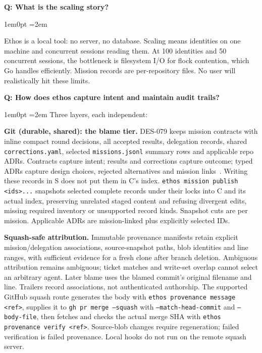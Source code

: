 \documentclass[11pt,letterpaper]{article}
\newcounter{faqnum}
\newenvironment{faqpair}[1]{%
  \needspace{4\baselineskip}%
  \vspace{0.5em}%
  \refstepcounter{faqnum}%
  \noindent\textbf{\color{SectionBlue}Q\thefaqnum: #1}\par\nopagebreak[4]%
  \vspace{0.2em}%
  \begin{adjustwidth}{1em}{0pt}%
  \setlength{\parindent}{0pt}%
  \emergencystretch=2em%
}{%
  \end{adjustwidth}%
  \vspace{0.5em}%
}
\begin{document}
\begin{faqpair}{What is the scaling story?}
Ethos is a local tool: no server, no database. Scaling means identities on one machine and concurrent sessions reading them. At 100 identities and 50 concurrent sessions, the bottleneck is filesystem I/O for flock contention, which Go handles efficiently. Mission records are per-repository files. No user will realistically hit these limits.
\end{faqpair}

\begin{faqpair}{How does ethos capture intent and maintain audit trails?}\label{faq:audit-trails}
Three layers, each independent:

\textbf{Git (durable, shared): the blame tier.} DES-079 keeps mission contracts with inline compact round decisions, all accepted results, delegation records, shared {\small\texttt{corrections.yaml}}, selected {\small\texttt{missions.jsonl}} summary rows and applicable repo ADRs. Contracts capture intent; results and corrections capture outcome; typed ADRs capture design choices, rejected alternatives and mission links~\cite{promptpals2026adrsai}. Writing these records in S does not put them in C's index. {\small\texttt{ethos mission publish <ids>...}} snapshots selected complete records under their locks into C and its actual index, preserving unrelated staged content and refusing divergent edits, missing required inventory or unsupported record kinds. Snapshot cuts are per mission. Applicable ADRs are mission-linked plus explicitly selected IDs.

\textbf{Squash-safe attribution.} Immutable provenance manifests retain explicit mission/delegation associations, source-snapshot paths, blob identities and line ranges, with sufficient evidence for a fresh clone after branch deletion. Ambiguous attribution remains ambiguous; ticket matches and write-set overlap cannot select an arbitrary agent. Later blame uses the blamed commit's original filename and line. Trailers record associations, not authenticated authorship. The supported GitHub squash route generates the body with {\small\texttt{ethos provenance message <ref>}}, supplies it to {\small\texttt{gh pr merge --squash}} with {\small\texttt{--match-head-commit}} and {\small\texttt{--body-file}}, then fetches and checks the actual merge SHA with {\small\texttt{ethos provenance verify <ref>}}. Source-blob changes require regeneration; failed verification is failed provenance. Local hooks do not run on the remote squash server.


\end{faqpair}
\end{document}
